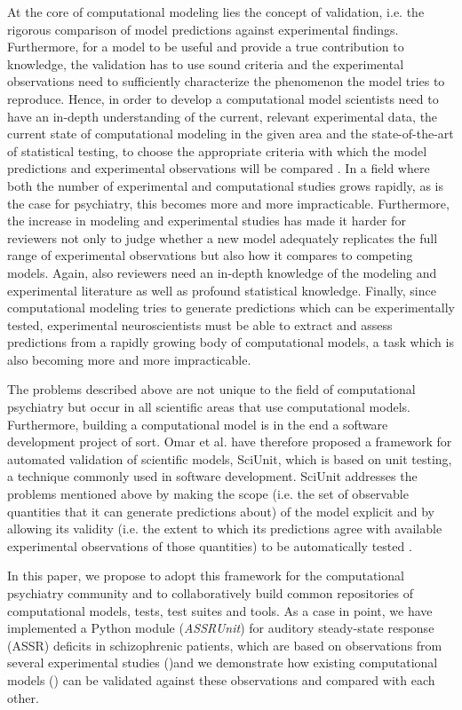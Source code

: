 \documentclass[a4paper,10pt]{article}
\begin{document}
At the core of computational modeling lies the concept of validation, i.e. the rigorous comparison of model predictions 
against experimental findings. Furthermore, for a model to be useful and provide a true contribution to knowledge, the validation has to 
use sound criteria and the experimental observations need to sufficiently characterize the phenomenon the model tries to reproduce.
Hence, in order to develop a computational model scientists need to have an in-depth understanding of the current, relevant experimental data, 
the current state of computational modeling in the given area and the state-of-the-art of statistical testing, to choose the appropriate criteria
with which the model predictions and experimental observations will be compared \cite{Gerkin2013,Sarma2016}. In a field where both the number of experimental 
and computational
studies grows rapidly, as is the case for psychiatry, this becomes more and more impracticable.
Furthermore, the increase in modeling and experimental studies has made it harder for reviewers not only to judge whether a new model adequately 
replicates the full range of experimental observations but also how it compares to competing models. Again, also reviewers need an 
in-depth knowledge of the modeling
and experimental literature as well as profound statistical knowledge.
Finally, since computational modeling tries to generate predictions which can be experimentally tested, experimental neuroscientists must be able 
to extract and assess predictions from a rapidly growing body of computational models, a task which is also becoming more and more impracticable.

The problems described above are not unique to the field of computational psychiatry but occur in all scientific areas that use computational models.
Furthermore, building a computational model is in the end a software development project of sort. Omar et al. \cite{Omar2014}
have therefore
proposed a framework for automated validation of scientific models, SciUnit, which is based on unit testing, a technique commonly used in software 
development.
SciUnit addresses the problems mentioned above by making the scope (i.e. the set of observable
quantities that it can generate predictions about) of the model explicit and by allowing its validity (i.e. the extent to which its predictions
agree with available experimental observations of those quantities) to be automatically tested \cite{Omar2014}.

In this paper, we  propose to adopt this framework for the computational psychiatry community and to collaboratively build
common repositories of computational models, tests, test suites and tools.
As a case in point, we have implemented a Python module (\textit{ASSRUnit}) for auditory steady-state response (ASSR) deficits in schizophrenic patients, which are based on 
observations from
several experimental studies (\cite{Krishnan2009,Vierling2008,Kwon1999})and we demonstrate
how existing computational models (\cite{Metzner2016,Beeman2013,Vierling2008,Metzner2017}) can be validated against these observations and compared with each 
other.
\end{document}
